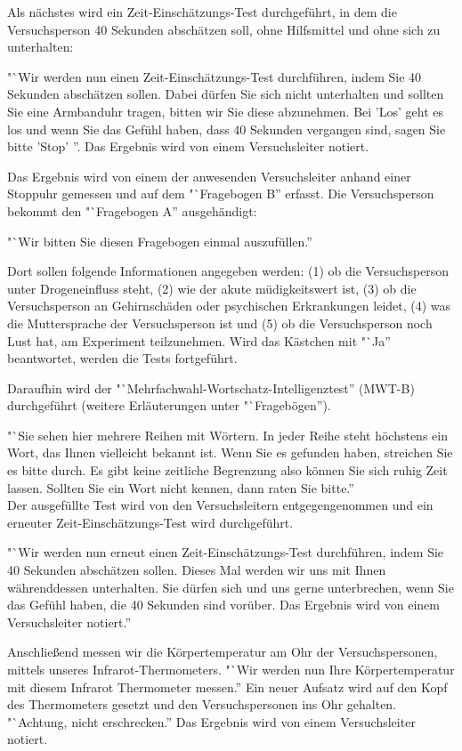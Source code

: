 \documentclass{Bericht}
\begin{document}
Als nächstes wird ein Zeit-Einschätzungs-Test durchgeführt, in dem die Versuchsperson 40 Sekunden abschätzen soll, ohne Hilfsmittel und ohne sich zu unterhalten:

"`Wir werden nun einen Zeit-Einschätzungs-Test durchführen, indem Sie 40 Sekunden abschätzen sollen. Dabei dürfen Sie sich nicht unterhalten und sollten Sie eine Armbanduhr tragen, bitten wir Sie diese abzunehmen.  Bei 'Los' geht es los und wenn Sie das Gefühl haben, dass 40 Sekunden vergangen sind, sagen Sie bitte 'Stop' ''. Das Ergebnis wird von einem Versuchsleiter notiert.

Das Ergebnis wird von einem der anwesenden Versuchsleiter anhand einer Stoppuhr gemessen und auf dem "`Fragebogen B'' erfasst. Die Versuchsperson bekommt den "`Fragebogen A'' ausgehändigt:

"`Wir bitten Sie diesen Fragebogen einmal auszufüllen.''

Dort sollen folgende Informationen angegeben werden: (1) ob die Versuchsperson unter Drogeneinfluss steht, (2) wie der akute müdigkeitswert ist, (3) ob die Versuchsperson an Gehirnschäden oder psychischen Erkrankungen leidet, (4) was die Muttersprache der Versuchsperson ist und (5) ob die Versuchsperson noch Lust hat, am Experiment teilzunehmen. Wird das Kästchen mit "`Ja'' beantwortet, werden die Tests fortgeführt.

Daraufhin wird der "`Mehrfachwahl-Wortschatz-Intelligenztest'' (MWT-B) durchgeführt (weitere Erläuterungen unter "`Fragebögen''). 

"`Sie sehen hier mehrere Reihen mit Wörtern. In jeder Reihe steht höchstens ein Wort, das Ihnen vielleicht bekannt ist. Wenn Sie es gefunden haben, streichen Sie es bitte durch. Es  gibt keine zeitliche Begrenzung also können Sie sich ruhig Zeit lassen. Sollten Sie ein Wort nicht kennen, dann raten Sie bitte.'' \\
Der ausgefüllte Test wird von den Versuchsleitern entgegengenommen und ein erneuter Zeit-Einschätzungs-Test wird durchgeführt. 

"`Wir werden nun erneut einen Zeit-Einschätzungs-Test durchführen, indem Sie 40 Sekunden abschätzen sollen. Dieses Mal werden wir uns mit Ihnen währenddessen unterhalten. Sie dürfen sich und uns gerne unterbrechen, wenn Sie das Gefühl haben, die 40 Sekunden sind vorüber. Das Ergebnis wird von einem Versuchsleiter notiert.''

Anschließend messen wir die Körpertemperatur am Ohr der Versuchspersonen, mittels unseres Infrarot-Thermometers. "`Wir werden nun Ihre Körpertemperatur mit diesem Infrarot Thermometer messen.'' Ein neuer Aufsatz wird auf den Kopf des Thermometers gesetzt und den Versuchspersonen ins Ohr gehalten. "`Achtung, nicht erschrecken.'' Das Ergebnis wird von einem Versuchsleiter notiert.
\end{document}
